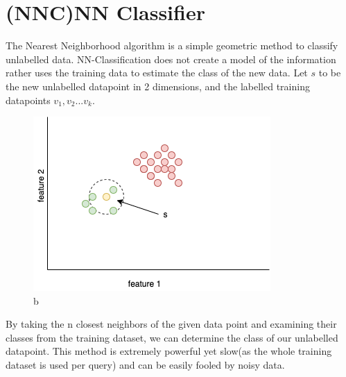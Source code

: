 \documentclass[openany]{book}
\begin{document}
		\section{(NNC)NN Classifier}
			The Nearest Neighborhood algorithm is a simple geometric method to classify unlabelled data. NN-Classification does not create a model of the information
			rather uses the training data to estimate the class of the new data. Let $s$ to be the new unlabelled datapoint in 2 dimensions, and the labelled training datapoints $v_1,v_2...v_k$.
			\begin{figure}[H]
				\iftrue
				\centering
				\caption{b}
				\includegraphics[scale=0.5]{res/nn}
				\fi
			\end{figure}
			By taking the n closest neighbors of the given data point and examining their classes from the training dataset, we can determine the class of our unlabelled datapoint.
			This method is extremely powerful yet slow(as the whole training dataset is used per query) and can be easily fooled by noisy data.
\end{document}
